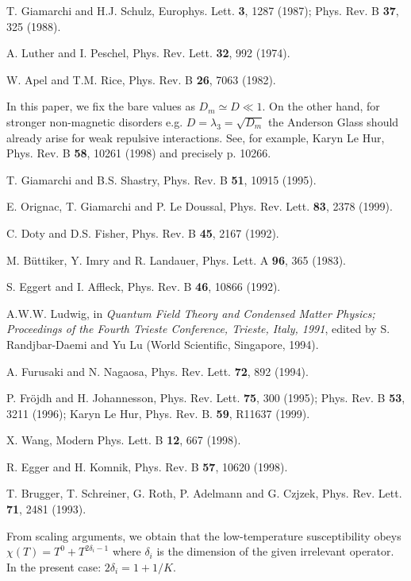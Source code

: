 \begin{references}
T. Giamarchi and H.J. Schulz, Europhys. Lett. {\bf 3}, 1287 (1987);
Phys. Rev. B {\bf 37}, 325 (1988).

A. Luther and I. Peschel, Phys. Rev. Lett. {\bf 32}, 992 (1974).

W. Apel and T.M. Rice, Phys. Rev. B {\bf 26}, 7063 (1982).

In this paper, we fix the bare values as $D_m\simeq D\ll 1$. On the
other hand, for
stronger non-magnetic disorders e.g. $D=\lambda_3=\sqrt{D_m}$ 
the Anderson Glass should already arise for weak repulsive interactions.
See, for example, Karyn
Le Hur, Phys. Rev. B {\bf 58}, 10261 (1998) and precisely
p. 10266.

T. Giamarchi and B.S. Shastry, Phys. Rev. B {\bf 51}, 10915 (1995).

E. Orignac, T. Giamarchi and P. Le Doussal, Phys. Rev. Lett. {\bf 83}, 2378
(1999).

C. Doty and D.S. Fisher, Phys. Rev. B {\bf 45}, 2167 (1992).

M. B\"uttiker, Y. Imry and R. Landauer, Phys. Lett. A {\bf 96}, 365 (1983).

S. Eggert and I. Affleck, Phys. Rev. B {\bf 46}, 10866 (1992).

A.W.W. Ludwig, in \emph{Quantum Field Theory and Condensed Matter Physics;
Proceedings of the Fourth Trieste Conference, Trieste, Italy, 1991}, edited
by S. Randjbar-Daemi and Yu Lu (World Scientific, Singapore, 1994).

A. Furusaki and N. Nagaosa, Phys. Rev. Lett. {\bf 72}, 892
(1994).

 P. Fr\" ojdh and H. Johannesson, Phys. Rev. Lett. 
{\bf 75}, 300 (1995); Phys. Rev. B {\bf 53}, 3211 (1996); 
Karyn Le Hur, Phys. Rev. B. {\bf 59}, R11637 (1999).

X. Wang, Modern Phys. Lett. B {\bf 12}, 667 (1998).

R. Egger and H. Komnik, Phys. Rev. B {\bf 57}, 10620 (1998).

T. Brugger, T. Schreiner, G. Roth, P. Adelmann and G. Czjzek,
Phys. Rev. Lett. {\bf 71}, 2481 (1993).

From scaling arguments, we obtain that the low-temperature
susceptibility obeys $\chi(T)=T^0+T^{2\delta_i-1}$ where $\delta_i$ is
the dimension of the given irrelevant operator. In the present case:
$2\delta_i=1+1/K$.


\end{references}
